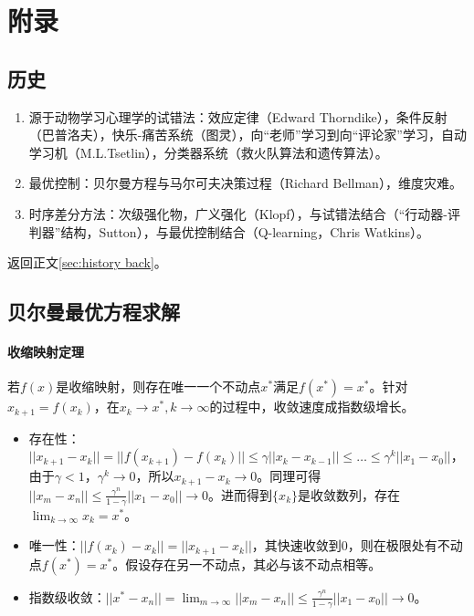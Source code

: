 \documentclass[
12pt, %
a4paper, 
oneside, %
headinclude,footinclude, %
]{scrartcl}
\begin{document}
\section{附录}
\subsection[历史]{历史}\label{sec:history}
\begin{enumerate}
\item 源于动物学习心理学的试错法：效应定律（Edward Thorndike），条件反射（巴普洛夫），快乐-痛苦系统（图灵），向“老师”学习到向“评论家”学习，自动学习机（M.L.Tsetlin），分类器系统（救火队算法和遗传算法）。
\item 最优控制：贝尔曼方程与马尔可夫决策过程（Richard Bellman），维度灾难。
\item 时序差分方法：次级强化物，广义强化（Klopf），与试错法结合（“行动器-评判器”结构，Sutton），与最优控制结合（Q-learning，Chris Watkins）。
\end{enumerate}

返回正文\ref{sec:history back}。
\subsection[贝尔曼最优方程求解]{贝尔曼最优方程求解}\label{sec:Scalability Mapping}
\paragraph{收缩映射定理}
若$ f(x) $是收缩映射，则存在唯一一个不动点$ x^* $满足$ f(x^*) = x^* $。针对$ x_{k + 1} = f(x_k) $，在$ x_k \to x^*, k \to \infty $的过程中，收敛速度成指数级增长。
\begin{itemize}
\item 存在性：$ ||x_{k + 1} - x_k|| = ||f(x_{k + 1}) - f(x_k)|| \leq \gamma||x_k - x_{k - 1}|| \leq \dots \leq \gamma^k||x_1 - x_0|| $，由于$ \gamma < 1 $，$ \gamma^k \to 0 $，所以$ x_{k + 1} - x_k \to 0 $。同理可得$ ||x_m - x_n|| \leq \frac{\gamma^n}{1 - \gamma}||x_1 - x_0|| \to 0 $。进而得到$ \{x_k\} $是收敛数列，存在$ \lim_{k \to \infty} x_k = x^* $。
\item 唯一性：$ ||f(x_k) - x_k|| = ||x_{k + 1} - x_k||$，其快速收敛到$ 0 $，则在极限处有不动点$ f(x^*) = x^* $。假设存在另一不动点，其必与该不动点相等。
\item 指数级收敛：$ ||x^* - x_n|| = \lim_{m \to \infty}||x_m - x_n|| \leq \frac{\gamma^n}{1 - \gamma}||x_1 - x_0|| \to 0 $。
\end{itemize}
\end{document}
